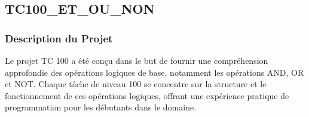 \documentclass[a4paper,12pt]{report}
\begin{document}
\newpage
\subsection{TC100\_ET\_OU\_NON}
\begin{center}
\label{}
\end{center}
\subsubsection{Description du Projet}
Le projet TC 100 a été conçu dans le but de fournir une compréhension approfondie des opérations logiques de base, notamment les opérations AND, OR et  NOT. Chaque tâche de niveau 100 se concentre sur la structure et le fonctionnement de ces opérations logiques, offrant une expérience pratique de programmation pour les débutants dans le domaine.
\end{document}
